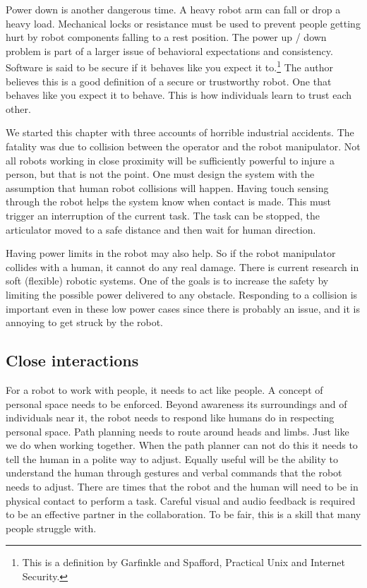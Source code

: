 Power down is another dangerous time. A heavy robot arm can fall or drop
a heavy load. Mechanical locks or resistance must be used to prevent
people getting hurt by robot components falling to a rest position. The
power up / down problem is part of a larger issue of behavioral
expectations and consistency. Software is said to be secure if it
behaves like you expect it to.\footnote{This is a definition by
  Garfinkle and Spafford, Practical Unix and Internet Security.} The
author believes this is a good definition of a secure or trustworthy
robot. One that behaves like you expect it to behave. This is how
individuals learn to trust each other.

We started this chapter with three accounts of horrible industrial
accidents. The fatality was due to collision between the operator and
the robot manipulator. Not all robots working in close proximity will be
sufficiently powerful to injure a person, but that is not the point. One
must design the system with the assumption that human robot collisions
will happen. Having touch sensing through the robot helps the system
know when contact is made. This must trigger an interruption of the
current task. The task can be stopped, the articulator moved to a safe
distance and then wait for human direction.

Having power limits in the robot may also help. So if the robot
manipulator collides with a human, it cannot do any real damage. There
is current research in soft (flexible) robotic systems. One of the goals
is to increase the safety by limiting the possible power delivered to
any obstacle. Responding to a collision is important even in these low
power cases since there is probably an issue, and it is annoying to get
struck by the robot.

\hypertarget{close-interactions}{%
\subsection{Close interactions}\label{close-interactions}}

For a robot to work with people, it needs to act like people. A concept
of personal space needs to be enforced. Beyond awareness its
surroundings and of individuals near it, the robot needs to respond like
humans do in respecting personal space. Path planning needs to route
around heads and limbs. Just like we do when working together. When the
path planner can not do this it needs to tell the human in a polite way
to adjust. Equally useful will be the ability to understand the human
through gestures and verbal commands that the robot needs to adjust.
There are times that the robot and the human will need to be in physical
contact to perform a task. Careful visual and audio feedback is required
to be an effective partner in the collaboration. To be fair, this is a
skill that many people struggle with.

